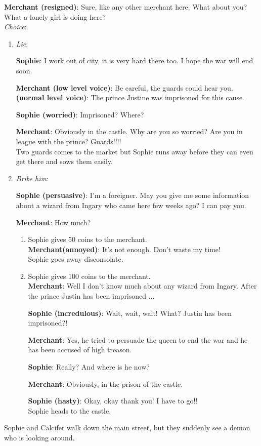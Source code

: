 \textbf{Merchant (resigned)}: Sure, like any other merchant here. What about you? What a lonely girl is doing here?\\

\noindent \textit{Choice}:
\begin{enumerate}
\item \textit{Lie}:
  
  \textbf{Sophie}: I work out of city, it is very hard there too. I hope the war will end soon.
  
  \textbf{Merchant (low level voice)}: Be careful, the guards could hear you. \textbf{(normal level voice)}: The prince Justine was imprisoned for this cause.
  
  \textbf{Sophie (worried)}: Imprisoned? Where? 

  \textbf{Merchant}: Obviously in the castle. Why are you so worried? Are you in league with the prince? Guards!!!!\\

  Two guards comes to the market but Sophie runs away before they can even get there and sows them easily.
  
\item \textit{Bribe him}:
  
  \textbf{Sophie (persuasive)}: I'm a foreigner. May you give me some information about a wizard from Ingary who came here few weeks ago? I can pay you.
  
  \textbf{Merchant}: How much?
  
  \begin{enumerate}
  \item Sophie gives 50 coins to the merchant.\\

    \textbf{Merchant(annoyed)}: It’s not enough. Don’t waste my time!\\

    \noindent Sophie goes away disconsolate.

  \item Sophie gives 100 coins to the merchant.\\
    
    \textbf{Merchant}: Well I don't know much about any wizard from Ingary. After the prince Justin has been imprisoned ...

    \textbf{Sophie (incredulous)}: Wait, wait, wait! What? Justin has been imprisoned?!
    
    \textbf{Merchant}: Yes, he tried to persuade the queen to end the war and he has been accused of high treason.
    
    \textbf{Sophie}: Really? And where is he now?
    
    \textbf{Merchant}: Obviously, in the prison of the castle.
    
    \textbf{Sophie (hasty)}: Okay, okay thank you! I have to go!!\\

    \noindent Sophie heads to the castle.
  \end{enumerate}
\end{enumerate}
\noindent Sophie and Calcifer walk down the main street, but they suddenly see a demon who is looking around.

